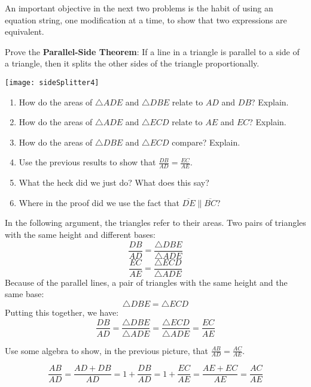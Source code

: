 \documentclass[nooutcomes]{ximera}
\begin{document}
\begin{teachingnote}
An important objective in the next two problems is the habit of using an equation string, one modification at a time, to show that two expressions are equivalent.
\end{teachingnote}

\begin{problem}
Prove the \textbf{Parallel-Side Theorem}:  If a line in a triangle is parallel to a side of a triangle, then it splits the other sides of the triangle proportionally. 
\begin{image}
\texttt{[image: sideSplitter4]}
\end{image}
\begin{enumerate}
\item How do the areas of $\triangle ADE$ and $\triangle DBE$ relate to $AD$ and $DB$?  Explain.  
\item How do the areas of $\triangle ADE$ and $\triangle ECD$ relate to $AE$ and $EC$?  Explain. 
\item How do the areas of $\triangle DBE$ and $\triangle ECD$ compare?  Explain.  
\item Use the previous results to show that $\frac{DB}{AD} = \frac{EC}{AE}$.  
\item What the heck did we just do?  What does this say?
\item Where in the proof did we use the fact that $\overline{DE} \parallel \overline{BC}$?  
\end{enumerate}
\end{problem}

\begin{teachingnote}
In the following argument, the triangles refer to their areas.  
Two pairs of triangles with the same height and different bases:  
\[
\frac{DB}{AD} = \frac{\triangle DBE}{\triangle ADE}
\]
\[
\frac{EC}{AE} = \frac{\triangle ECD}{\triangle ADE}
\]
Because of the parallel lines, a pair of triangles with the same height and the same base:  
\[
\triangle DBE = \triangle ECD
\]
Putting this together, we have:  
\[
\frac{DB}{AD} = \frac{\triangle DBE}{\triangle ADE} = \frac{\triangle ECD}{\triangle ADE}
=\frac{EC}{AE}
\]
\end{teachingnote}


\begin{problem}
Use some algebra to show, in the previous picture, that $\frac{AB}{AD} = \frac{AC}{AE}$.
\end{problem}

\begin{teachingnote}
\[
\frac{AB}{AD} = \frac{AD+DB}{AD} = 1 + \frac{DB}{AD} =  1 + \frac{EC}{AE} 
= \frac{AE + EC}{AE} = \frac{AC}{AE}
\]
\end{teachingnote}
\end{document}
